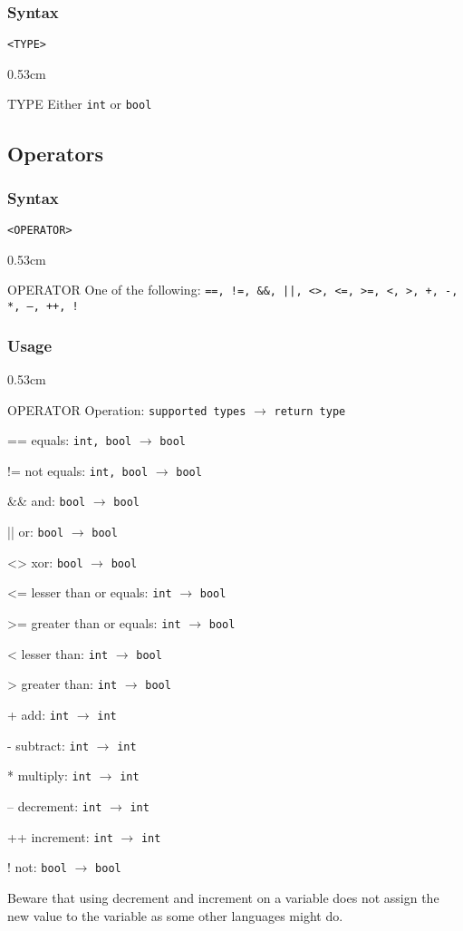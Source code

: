 \documentclass[twoside]{report}
\newenvironment{mycompactdesc}{\begin{adjustwidth}{0.53cm}{}\begin{compactdesc}}{\end{compactdesc}\end{adjustwidth}}
\begin{document}
\subsubsection*{Syntax}
\texttt{<TYPE>}
\begin{mycompactdesc}
	\item[TYPE] Either \texttt{int} or \texttt{bool}
\end{mycompactdesc}


\subsection{Operators}
\label{def:operators}
\subsubsection*{Syntax}
\texttt{<OPERATOR>}
\begin{mycompactdesc}
	\item[OPERATOR] One of the following: \texttt{==, !=, \&\&, ||, <>, <=, >=, <, >, +, -, *, --, ++, !}
\end{mycompactdesc}
\subsubsection*{Usage}
\begin{mycompactdesc}
	\item[OPERATOR] Operation: \texttt{supported types} $\rightarrow$ \texttt{return type}
	\item[==] equals: \texttt{int, bool} $\rightarrow$ \texttt{bool}
	\item[!=] not equals: \texttt{int, bool} $\rightarrow$ \texttt{bool}
	\item[\&\&] and: \texttt{bool} $\rightarrow$ \texttt{bool}
	\item[||] or: \texttt{bool} $\rightarrow$ \texttt{bool}
	\item[<>] xor: \texttt{bool} $\rightarrow$ \texttt{bool}
	\item[<=] lesser than or equals: \texttt{int} $\rightarrow$ \texttt{bool}
	\item[>=] greater than or equals: \texttt{int} $\rightarrow$ \texttt{bool}
	\item[<] lesser than: \texttt{int} $\rightarrow$ \texttt{bool}
	\item[>] greater than: \texttt{int} $\rightarrow$ \texttt{bool}
	\item[+] add: \texttt{int} $\rightarrow$ \texttt{int}
	\item[-] subtract: \texttt{int} $\rightarrow$ \texttt{int}
	\item[*] multiply: \texttt{int} $\rightarrow$ \texttt{int}
	\item[--] decrement: \texttt{int} $\rightarrow$ \texttt{int}
	\item[++] increment: \texttt{int} $\rightarrow$ \texttt{int}
	\item[!] not: \texttt{bool} $\rightarrow$ \texttt{bool}
\end{mycompactdesc}
Beware that using decrement and increment on a variable does not assign the new value to the variable as some other languages might do.
\end{document}
